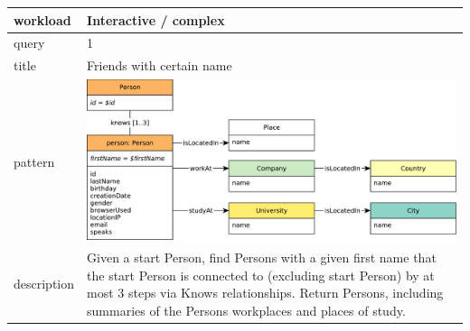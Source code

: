 \renewcommand*{\arraystretch}{1.1}

\noindent\begin{tabularx}{17cm}{|p{1.95cm}|X|}
	\hline
	workload    & Interactive / complex \\ \hline
%
	query       & 1 \\ \hline
%
	title       & Friends with certain name \\ \hline
%
    pattern     & \hfill\includegraphics[scale=\patternscale,margin=0cm .2cm]{patterns/interactive-complex-read-01}\hfill\vadjust{} \\ \hline
%
	description & Given a start Person, find Persons with a given first name that the
start Person is connected to (excluding start Person) by at most 3 steps
via Knows relationships. Return Persons, including summaries of the
Persons workplaces and places of study.
 \\ \hline
	

\end{tabularx}
